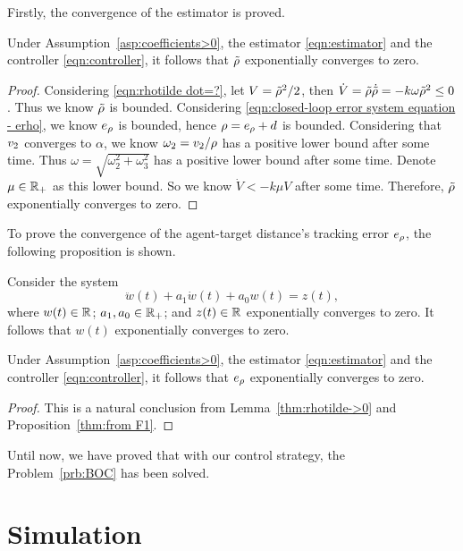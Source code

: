 \documentclass[5p,authoryear,preprint]{elsarticle}\linenofalse
\begin{document}
Firstly, the convergence of the estimator is proved.

\begin{lemma}\label{thm:rhotilde->0}
Under Assumption~\ref{asp:coefficients>0},
the estimator \eqref{eqn:estimator} and
the controller \eqref{eqn:controller}, it follows that
$\tilde{\rho}$ exponentially converges to zero.
\end{lemma}

\begin{proof}
Considering \eqref{eqn:rhotilde dot=?}, let $V=\tilde{\rho}^2/2$,
then $\dot V=\tilde{\rho}\dot{\tilde{\rho}}=-k\omega\tilde{\rho}^2\le0$.
Thus we know $\tilde{\rho}$ is bounded.
Considering \eqref{eqn:closed-loop error system equation - erho},
we know $e_\rho$ is bounded, hence $\rho=e_\rho+d$ is bounded.
Considering that $v_2$  converges to $\alpha$,
we know $\omega_2=v_2/\rho$ has a positive lower bound after some time.
Thus $\omega=\sqrt{\omega_2^2+\omega_3^2}$ has a positive lower bound after some time.
Denote $\mu\in\mathbb{R}_+$ as this lower bound.
So we know $\dot V<-k\mu V$ after some time.
Therefore, $\tilde{\rho}$ exponentially converges to zero.
\end{proof}

To prove the convergence of the agent-target distance's tracking error $e_\rho$, the following proposition is shown.
\begin{proposition}\label{thm:from F1}
Consider the system
\[
\ddot w(t)+a_1\dot w(t)+a_0w(t)=z(t),
\]
	where $w(t)\in\mathbb{R}$; $a_1,a_0\in\mathbb{R}_+$; and $z(t)\in\mathbb{R}$ exponentially converges to zero.
	It follows that $w(t)$ exponentially converges to zero.
\end{proposition}

\begin{theorem}
Under Assumption~\ref{asp:coefficients>0},
the estimator \eqref{eqn:estimator} and
the controller \eqref{eqn:controller}, it follows that
$e_\rho$ exponentially converges to zero.
\end{theorem}

\begin{proof}
This is a natural conclusion from Lemma~\ref{thm:rhotilde->0}
and Proposition~\ref{thm:from F1}.
\end{proof}

Until now, we have proved that with our control strategy, the Problem~\ref{prb:BOC} has been solved.

\section{Simulation}
\end{document}
